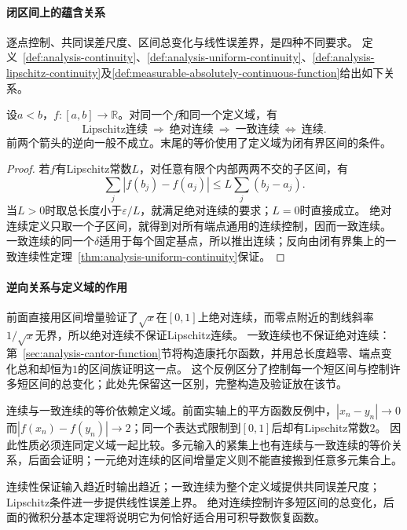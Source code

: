 \paragraph{闭区间上的蕴含关系}
逐点控制、共同误差尺度、区间总变化与线性误差界，是四种不同要求。
定义~\ref{def:analysis-continuity}、\ref{def:analysis-uniform-continuity}、\ref{def:analysis-lipschitz-continuity}及\ref{def:measurable-absolutely-continuous-function}给出如下关系。
\begin{theorem}[闭区间上连续性条件的关系]
\label{thm:analysis-continuity-implications}
设$a<b$，$f:[a,b]\to\mathbb R$。对同一个$f$和同一个定义域，有
\[
 \text{Lipschitz连续}\ \Longrightarrow\ \text{绝对连续}
 \ \Longrightarrow\ \text{一致连续}\ \Longleftrightarrow\ \text{连续}.
\]
前两个箭头的逆向一般不成立。末尾的等价使用了定义域为闭有界区间的条件。
\end{theorem}
\begin{proof}
若$f$有Lipschitz常数$L$，对任意有限个内部两两不交的子区间，有
\[
 \sum_j|f(b_j)-f(a_j)|\leq L\sum_j(b_j-a_j).
\]
当$L>0$时取总长度小于$\varepsilon/L$，就满足绝对连续的要求；$L=0$时直接成立。
绝对连续定义只取一个子区间，就得到对所有端点通用的连续控制，因而一致连续。
一致连续的同一个$\delta$适用于每个固定基点，所以推出连续；反向由闭有界集上的一致连续性定理~\ref{thm:analysis-uniform-continuity}保证。
\end{proof}

\paragraph{逆向关系与定义域的作用}
前面直接用区间增量验证了$\sqrt x$在$[0,1]$上绝对连续，而零点附近的割线斜率$1/\sqrt x$无界，所以绝对连续不保证Lipschitz连续。
一致连续也不保证绝对连续：第~\ref{sec:analysis-cantor-function}节将构造康托尔函数，并用总长度趋零、端点变化总和却恒为$1$的区间族证明这一点。
这个反例区分了控制每一个短区间与控制许多短区间的总变化；此处先保留这一区别，完整构造及验证放在该节。

连续与一致连续的等价依赖定义域。前面实轴上的平方函数反例中，$|x_n-y_n|\to0$而$|f(x_n)-f(y_n)|\to2$；同一个表达式限制到$[0,1]$后却有Lipschitz常数$2$。
因此性质必须连同定义域一起比较。多元输入的紧集上也有连续与一致连续的等价关系，后面会证明；一元绝对连续的区间增量定义则不能直接搬到任意多元集合上。

连续性保证输入趋近时输出趋近；一致连续为整个定义域提供共同误差尺度；Lipschitz条件进一步提供线性误差上界。
绝对连续控制许多短区间的总变化，后面的微积分基本定理将说明它为何恰好适合用可积导数恢复函数。

